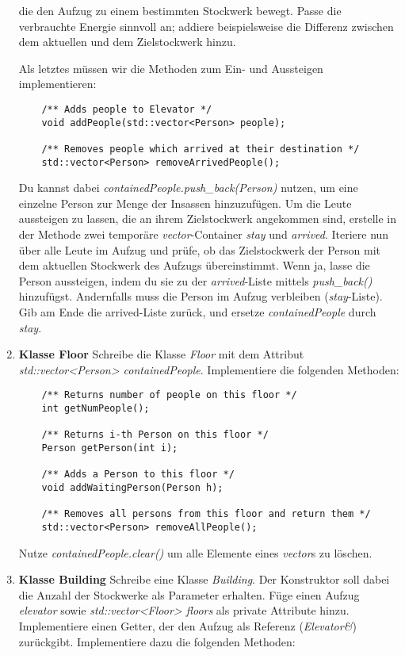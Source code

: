 \begin{enumerate}
die den Aufzug zu einem bestimmten Stockwerk bewegt.
Passe die verbrauchte Energie sinnvoll an; addiere beispielsweise die Differenz zwischen dem aktuellen und dem Zielstockwerk hinzu.

Als letztes müssen wir die Methoden zum Ein- und Aussteigen implementieren:
\begin{lstlisting}
	/** Adds people to Elevator */
	void addPeople(std::vector<Person> people);

	/** Removes people which arrived at their destination */
	std::vector<Person> removeArrivedPeople();
\end{lstlisting} 

Du kannst dabei \emph{containedPeople.push\_back(Person)} nutzen, um eine einzelne Person zur Menge der Insassen hinzuzufügen. 
Um die Leute aussteigen zu lassen, die an ihrem Zielstockwerk angekommen sind, erstelle in der Methode zwei temporäre \emph{vector}-Container   \emph{stay} und \emph{arrived}. 
Iteriere nun über alle Leute im Aufzug und prüfe, ob das Zielstockwerk der Person mit dem aktuellen Stockwerk des Aufzugs übereinstimmt.
Wenn ja, lasse die Person aussteigen, indem du sie zu der \emph{arrived}-Liste mittels \emph{push\_back()} hinzufügst.
Andernfalls muss die Person im Aufzug verbleiben (\emph{stay}-Liste). 
Gib am Ende die arrived-Liste zurück, und ersetze \emph{containedPeople} durch \emph{stay}.

\item \textbf{Klasse Floor}
Schreibe die Klasse \emph{Floor} mit dem Attribut \emph{std::vector<Person> containedPeople}.
Implementiere die folgenden Methoden:

\begin{lstlisting}
	/** Returns number of people on this floor */
	int getNumPeople();
	
	/** Returns i-th Person on this floor */
	Person getPerson(int i);
	
	/** Adds a Person to this floor */
	void addWaitingPerson(Person h);
	
	/** Removes all persons from this floor and return them */
	std::vector<Person> removeAllPeople();
\end{lstlisting}

Nutze \emph{containedPeople.clear()} um alle Elemente eines \emph{vector}s zu löschen.

\item\textbf{Klasse Building}
Schreibe eine Klasse \emph{Building}.
Der Konstruktor soll dabei die Anzahl der Stockwerke als Parameter erhalten.
Füge einen Aufzug \emph{elevator} sowie \emph{std::vector<Floor> floors} als private Attribute hinzu.
Implementiere einen Getter, der den Aufzug als Referenz (\emph{Elevator\&}) zurückgibt.
Implementiere dazu die folgenden Methoden:


\end{enumerate}
